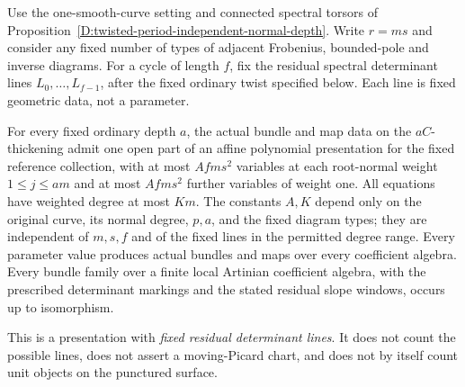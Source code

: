 \begin{proposition}
\label{D:weighted-fixed-determinant-normal-presentation}
Use the one-smooth-curve setting and connected spectral torsors
of Proposition~\ref{D:twisted-period-independent-normal-depth}.
Write $r=ms$ and consider any fixed number of types of adjacent
Frobenius, bounded-pole and inverse diagrams. For a cycle of
length $f$, fix the residual spectral determinant lines
$L_0,\ldots,L_{f-1}$, after the fixed ordinary twist specified
below. Each line is fixed geometric data, not a parameter.

For every fixed ordinary depth $a$, the actual bundle and
map data on the $aC$-thickening admit one open part of an affine
polynomial presentation for the fixed reference collection,
with at most $A fms^2$ variables
at each root-normal weight $1\leq j\leq am$ and at most
$A fms^2$ further variables of weight one. All equations
have weighted degree at most $K m$. The constants $A,K$
depend only on the original curve, its normal degree,
$p,a$, and the fixed diagram types; they are independent
of $m,s,f$ and of the fixed lines in the permitted degree
range. Every parameter value produces actual bundles and
maps over every coefficient algebra. Every bundle family
over a finite local Artinian coefficient algebra, with
the prescribed determinant markings and the stated
residual slope windows, occurs up to isomorphism.

This is a presentation with \emph{fixed residual determinant
lines}. It does not count the possible lines, does not
assert a moving-Picard chart, and does not by itself count
unit objects on the punctured surface.
\end{proposition}

